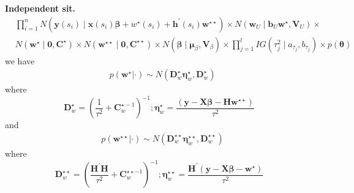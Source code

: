 \documentclass[
12pt, %
a4paper, %
oneside, %
headinclude,footinclude, %
BCOR5mm, %
]{scrartcl}
\begin{document}
\begin{itemize}
\begin{itemize}
\textbf{Independent sit.}
\begin{equation}
\begin{aligned}
& \prod_{i=1}^{n} N\left(\mathbf{y}\left({s}_{i}\right) \mid \mathbf{x}\left({s}_{i}\right) \boldsymbol{\beta}+
w^{\star}\left(s_i\right) + \mathbf{h}^\prime(s_i)\mathbf{w}^{\star\star}\right) \times N\left(\boldsymbol{w}_{U} \mid \mathbf{b}_{U}\mathbf{w}^{\star}, \boldsymbol{V}_{U}\right) \times \\ & 
N\left(\mathbf{w}^{\star} \mid \boldsymbol{0}, {\mathbf{C}}^{\star}\right) \times N\left(\mathbf{w}^{\star\star} \mid \boldsymbol{0}, {\mathbf{C}}^{\star\star}\right) \times N\left(\boldsymbol{\beta} \mid \boldsymbol{\mu}_{\beta}, \mathbf{V}_{\beta}\right) \times  \prod_{j=1}^{l} I G\left(\tau_{j}^{2} \mid a_{\tau_{j}}, b_{\tau_{j}}\right) \times p(\boldsymbol{\theta})
\end{aligned}
\end{equation}
we have 
\begin{equation}
\begin{aligned}
& p\left(\mathbf{w}^{\star}|\cdot\right) \sim N\left(\boldsymbol{D}^{\star}_w \boldsymbol{\eta}^{\star}_w, \boldsymbol{D}^{\star}_w\right)
\end{aligned}
\end{equation}
where 
\begin{equation*}
\boldsymbol{D}^{\star}_w=\left(\frac{1}{\tau^{2}}+\boldsymbol{C}_{w}^{\star -1}\right)^{-1} ; \boldsymbol{\eta}^{\star}_w = \frac{\left(\boldsymbol{y} - \boldsymbol{X}\boldsymbol{\beta} -  \boldsymbol{H}\boldsymbol{w}^{\star\star}\right)}{\tau^{2}} \label{Eq:gibbs_block_w1}
\end{equation*}
and
\begin{equation}
\begin{aligned}
& p\left(\mathbf{w}^{\star\star}|\cdot\right) \sim N\left(\boldsymbol{D}^{\star\star}_w \boldsymbol{\eta}^{\star\star}_w, \boldsymbol{D}^{\star\star}_w\right)
\end{aligned}
\end{equation}
where
\begin{equation*}
\boldsymbol{D}^{\star\star}_w=\left(\frac{\boldsymbol{H}^\prime\boldsymbol{H}}{\tau^{2}}+\boldsymbol{C}_{w}^{\star\star -1}\right)^{-1} ; \boldsymbol{\eta}^{\star\star}_w = \frac{\boldsymbol{H}^\prime\left(\boldsymbol{y} - \boldsymbol{X}\boldsymbol{\beta} - \boldsymbol{w}^{\star}\right)}{\tau^{2}} \label{Eq:gibbs_block_w2}
\end{equation*}


\end{itemize}
\end{itemize}
\end{document}

